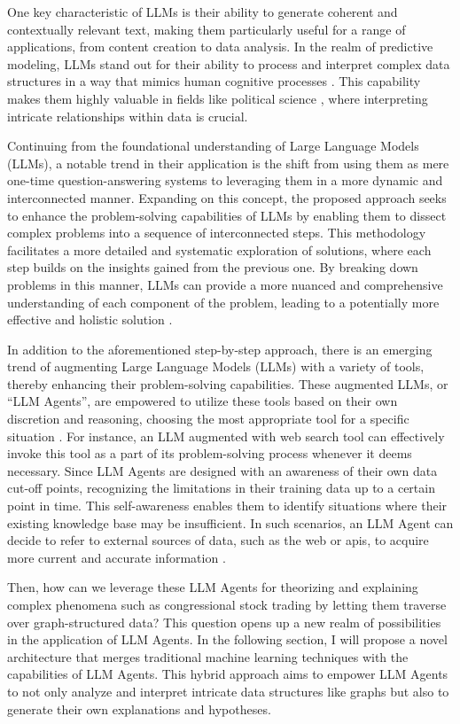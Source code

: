 \documentclass[15pt,letterpaper]{article}
\begin{document}
One key characteristic of LLMs is their ability to generate coherent and contextually relevant text, making them particularly useful for a range of applications, from content creation to data analysis. In the realm of predictive modeling, LLMs stand out for their ability to process and interpret complex data structures in a way that mimics human cognitive processes \citep{Kojima2022LargeLM, Hayashi2019LatentRL}. 
This capability makes them highly valuable in fields like political science \citep{Luitse2021TheGT}, where interpreting intricate relationships within data is crucial.

Continuing from the foundational understanding of Large Language Models (LLMs), a notable trend in their application is the shift from using them as mere one-time question-answering systems to leveraging them in a more dynamic and interconnected manner. Expanding on this concept, the proposed approach seeks to enhance the problem-solving capabilities of LLMs by enabling them to dissect complex problems into a sequence of interconnected steps. This methodology facilitates a more detailed and systematic exploration of solutions, where each step builds on the insights gained from the previous one. By breaking down problems in this manner, LLMs can provide a more nuanced and comprehensive understanding of each component of the problem, leading to a potentially more effective and holistic solution \citep{cot, yao2023tree}.

In addition to the aforementioned step-by-step approach, there is an emerging trend of augmenting Large Language Models (LLMs) with a variety of tools, thereby enhancing their problem-solving capabilities. These augmented LLMs, or  ``LLM Agents'', are empowered to utilize these tools based on their own discretion and reasoning, choosing the most appropriate tool for a specific situation \citep{yao2023react}. For instance, an LLM augmented with web search tool can effectively invoke this tool as a part of its problem-solving process whenever it deems necessary.
Since LLM Agents are designed with an awareness of their own data cut-off points, recognizing the limitations in their training data up to a certain point in time. This self-awareness enables them to identify situations where their existing knowledge base may be insufficient. In such scenarios, an LLM Agent can decide to refer to external sources of data, such as the web or apis, to acquire more current and accurate information \citep{Qin2023ToolLLMFL, patil2023gorilla}. 

Then, how can we leverage these LLM Agents for theorizing and explaining complex phenomena such as congressional stock trading by letting them traverse over graph-structured data? This question opens up a new realm of possibilities in the application of LLM Agents. In the following section, I will propose a novel architecture that merges traditional machine learning techniques with the capabilities of LLM Agents. This hybrid approach aims to empower LLM Agents to not only analyze and interpret intricate data structures like graphs but also to generate their own explanations and hypotheses.
\end{document}
